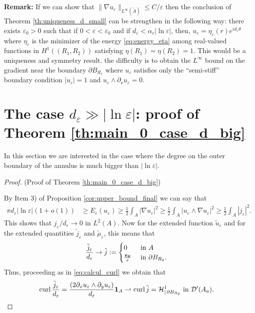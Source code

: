 \documentclass[12pt,reqno]{amsart}
\def\e {{\varepsilon}}
\renewcommand{\vec}[1]{\text{\boldmath $#1$}}
\def\curl{{\rm curl\,}}
\def \p {\partial}
\numberwithin{equation}{section}
\begin{document}
\medskip

\textbf{Remark:}  If we can show that \(\|\nabla u_\e\|_{L^\infty(\tilde{A})}\leq C/\e\) then the conclusion of Theorem \ref{th:uniqueness_d_small} can be strengthen in the following way: there exists \(\e_0>0\) such that if \(0<\e<\e_0\) and if \(d_\e< \alpha_c|\ln \e|\), then, \(u_\e =\eta_\e(r)e^{id_\e\theta}\) where \(\eta_\e\) is the minimizer of the energy \eqref{eq:energy_eta} among real-valued functions in \(H^1( (R_1,R_2))\) satisfying \(\eta(R_1)=\eta(R_2)=1\). This would be a uniqueness and symmetry result. the difficulty is to obtain the \(L^\infty\) bound on the gradient near the boundary \(\p B_{R_1}\) where \(u_\e\) satisfies only the ``semi-stiff'' boundary condition \(|u_\e|=1\) and \(u_\e \wedge \p_\nu u_\e=0\).



\section{The case \(d_\e \gg |\ln \e|\): proof of Theorem \ref{th:main_0_case_d_big}}\label{sec:d_big}
In this section we are interested in the case where the degree on the outer boundary of the annulus is much bigger than \(|\ln \e|\).

\begin{proof}(Proof of Theorem \ref{th:main_0_case_d_big})

By Item 3) of Proposition \ref{cor:upper_bound_final} we can say that
\begin{align*}
\pi d_\e |\ln \e|(1+o(1)) &\geq E_\e(u_\e)\geq \frac12 \int_A |\nabla u_\e|^2  \geq \frac12 \int_A |u_\e\wedge \nabla u_\e|^2 \geq \frac12 \int_A |j_\e|^2.
\end{align*}
This shows that \(j_\e/d_\e \rightarrow 0\) in \(L^2(A)\). Now for the extended function \(\tilde{u}_\e\) and for the extended quantities \(\tilde{j}_\e\) and \(\tilde{\mu}_\e\), this means that
\[\frac{\tilde{j}_\e}{d_\e} \rightarrow \tilde{j}:= \begin{cases} 0 & \text{ in } A \\
\frac{\vec{e_\theta}}{r} & \text{ in } \p B_{R_2}.\end{cases}\]
Thus, proceeding as in \eqref{eq:calcul_curl} we obtain that
 \[\curl \frac{\tilde{j}_\e}{d_\e}= \frac{(2\p_x u_\e\wedge \p_y u_\e)}{d_\e} \textbf{1}_{A}\rightharpoonup \curl \tilde{j}=\mathcal{H}^1_{\lfloor \p B_{R_2}} \text{ in } \mathcal{D}'(A_a).\]


\end{proof}
\end{document}
